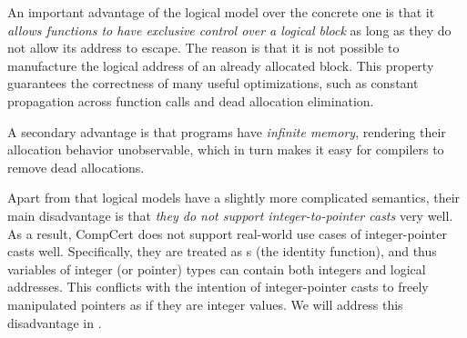 An important advantage of the logical model over the concrete one is that 
it \emph{allows functions to have exclusive control over a logical block} as 
long as they do not allow its address to escape. The reason is that it
is not possible to manufacture the logical address of an already allocated block.  
This property guarantees the correctness of many useful optimizations, 
such as constant propagation across function calls and dead allocation
elimination.

A secondary advantage is that programs have \emph{infinite memory}, rendering
their allocation behavior unobservable, which in turn makes it easy for
compilers to remove dead allocations.


Apart from that logical models have a slightly more complicated semantics, their main disadvantage
is that \emph{they do not support integer-to-pointer casts} very well.  As a result, CompCert does
not support real-world use cases of integer-pointer casts well.
Specifically, they are treated as s (\ie the identity function), and thus variables of
integer (or pointer) types can contain both integers and logical addresses.  This conflicts with the
intention of integer-pointer casts to freely manipulated pointers as if they are integer values.  We
will address this disadvantage in .



